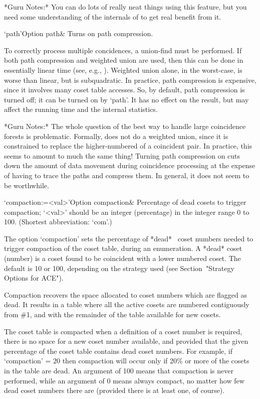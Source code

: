 *Guru Notes:*
You can do lots of really neat things using this feature, but you need
some understanding of the internals of {\ACE} to get real benefit from
it.

\>`path'{Option path}&
Turns on path compression.

To correctly  process  multiple  concidences,  a  union-find  must  be
performed. If both path compression and weighted union are used,  then
this can be done in essentially linear time (see, e.g., \cite{CLR90}).
Weighted union alone, in the worst-case, is worse than linear, but  is
subquadratic. In practice, path compression  is  expensive,  since  it
involves many coset table accesses. So, by default,  path  compression
is turned off; it can be turned on by `path'. It has no effect on  the
result, but may affect the running time and the internal statistics.

*Guru Notes:*
The whole question of the best way to handle large coincidence forests
is problematic.  Formally, {\ACE} does  not do a weighted union, since
it is constrained to replace the higher-numbered of a coincident pair.
In practice,  this seems  to amount to  much the same  thing!  Turning
path  compression on  cuts down  the  amount of  data movement  during
coincidence processing at the expense of having to trace the paths and
compress them.  In general, it does not seem to be worthwhile.

\>`compaction:=<val>'{Option compaction}&
Percentage of dead cosets to trigger compaction;
`<val>' should be an integer (percentage) in the integer range 0 to 100.
(Shortest abbreviation: `com'.)

The option `compaction'  sets  the  percentage  of  *dead*~ coset numbers needed  to  trigger  compaction  of  the
coset table, during an enumeration. A *dead* coset (number) is a coset
found to be coincident with a lower numbered coset. The default is  10
or 100, depending on the strategy used (see Section~"Strategy  Options
for ACE").

Compaction recovers the space allocated to  coset  numbers  which  are
flagged as dead. It results in a table where all the active cosets are
numbered contiguously from \#1, and with the remainder  of  the  table
available for new cosets.

The coset table is compacted when a definition of a  coset  number  is
required, there is no space for a  new  coset  number  available,  and
provided that the given percentage of the coset  table  contains  dead
coset numbers. For example, if `compaction'  =  $20$  then  compaction
will occur only if 20\% or more of the cosets in the table  are  dead.
An argument of 100 means that compaction is never performed, while  an
argument of 0 means always compact,  no  matter  how  few  dead  coset
numbers there are (provided there is at least one, of course).

